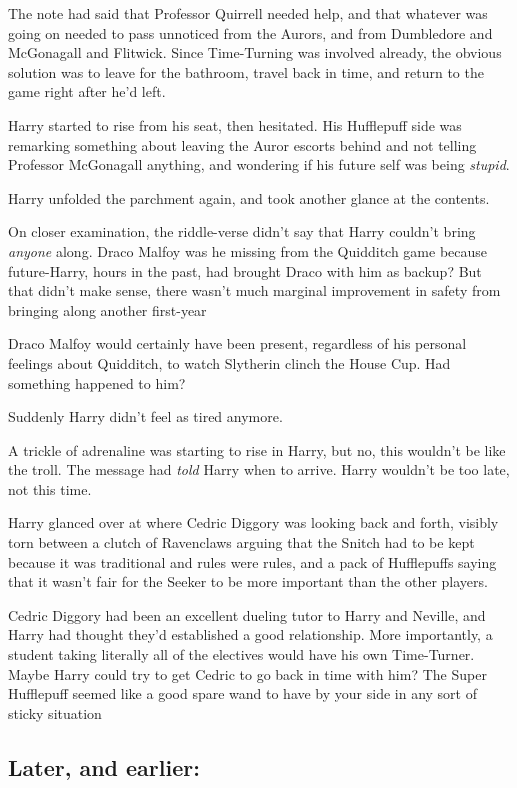 The note had said that Professor Quirrell needed help, and that whatever was
going on needed to pass unnoticed from the Aurors, and from Dumbledore and
McGonagall and Flitwick. Since Time-Turning was involved already, the obvious
solution was to leave for the bathroom, travel back in time, and return to the game
right after he'd left.

Harry started to rise from his seat, then hesitated. His Hufflepuff side was
remarking something about leaving the Auror escorts behind and not telling
Professor McGonagall anything, and wondering if his future self was being
\emph{stupid}.

Harry unfolded the parchment again, and took another glance at the contents.

On closer examination, the riddle-verse didn't say that Harry couldn't bring
\emph{anyone} along. Draco Malfoy{\el} was he missing from the Quidditch
game because future-Harry, hours in the past, had brought Draco with him as
backup? But that didn't make sense, there wasn't much marginal improvement in
safety from bringing along another first-year{\el}

{\el} Draco Malfoy would certainly have been present, regardless of his
personal feelings about Quidditch, to watch Slytherin clinch the House Cup. Had
something happened to him?

Suddenly Harry didn't feel as tired anymore.

A trickle of adrenaline was starting to rise in Harry, but no, this wouldn't be
like the troll. The message had \emph{told} Harry when to arrive. Harry
wouldn't be too late, not this time.

Harry glanced over at where Cedric Diggory was looking back and forth, visibly
torn between a clutch of Ravenclaws arguing that the Snitch had to be kept
because it was traditional and rules were rules, and a pack of Hufflepuffs
saying that it wasn't fair for the Seeker to be more important than the other
players.

Cedric Diggory had been an excellent dueling tutor to Harry and Neville, and
Harry had thought they'd established a good relationship. More importantly, a
student taking literally all of the electives would have his own Time-Turner.
Maybe Harry could try to get Cedric to go back in time with him? The Super
Hufflepuff seemed like a good spare wand to have by your side in any sort of
sticky situation{\el}
\sbreak
\vspace{-2\baselineskip}
\subsection{Later, and earlier:}

